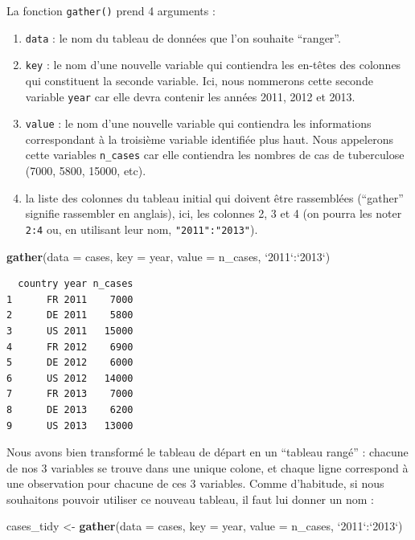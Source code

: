 \documentclass[a4paperpaper,]{article}
\newenvironment{Shaded}{\begin{snugshade}}{\end{snugshade}}
\newcommand{\DataTypeTok}[1]{\textcolor[rgb]{0.00,0.34,0.68}{#1}}
\newcommand{\KeywordTok}[1]{\textcolor[rgb]{0.12,0.11,0.11}{\textbf{#1}}}
\newcommand{\NormalTok}[1]{\textcolor[rgb]{0.12,0.11,0.11}{#1}}
\newcommand{\OperatorTok}[1]{\textcolor[rgb]{0.12,0.11,0.11}{#1}}
\newcommand{\StringTok}[1]{\textcolor[rgb]{0.75,0.01,0.01}{#1}}
\providecommand{\tightlist}{%
  \setlength{\itemsep}{0pt}\setlength{\parskip}{0pt}}
\begin{document}
La fonction \texttt{gather()} prend 4 arguments :

\begin{enumerate}
\def\labelenumi{\arabic{enumi}.}
\tightlist
\item
  \texttt{data} : le nom du tableau de données que l'on souhaite ``ranger''.
\item
  \texttt{key} : le nom d'une nouvelle variable qui contiendra les en-têtes des colonnes qui constituent la seconde variable. Ici, nous nommerons cette seconde variable \texttt{year} car elle devra contenir les années 2011, 2012 et 2013.
\item
  \texttt{value} : le nom d'une nouvelle variable qui contiendra les informations correspondant à la troisième variable identifiée plus haut. Nous appelerons cette variables \texttt{n\_cases} car elle contiendra les nombres de cas de tuberculose (7000, 5800, 15000, etc).
\item
  la liste des colonnes du tableau initial qui doivent être rassemblées (``gather'' signifie rassembler en anglais), ici, les colonnes 2, 3 et 4 (on pourra les noter \texttt{2:4} ou, en utilisant leur nom, \texttt{"2011":"2013"}).
\end{enumerate}

\begin{Shaded}
\begin{Highlighting}[]
\KeywordTok{gather}\NormalTok{(}\DataTypeTok{data =}\NormalTok{ cases, }\DataTypeTok{key =}\NormalTok{ year, }\DataTypeTok{value =}\NormalTok{ n_cases, }\StringTok{`}\DataTypeTok{2011}\StringTok{`}\OperatorTok{:}\StringTok{`}\DataTypeTok{2013}\StringTok{`}\NormalTok{)}
\end{Highlighting}
\end{Shaded}

\begin{verbatim}
  country year n_cases
1      FR 2011    7000
2      DE 2011    5800
3      US 2011   15000
4      FR 2012    6900
5      DE 2012    6000
6      US 2012   14000
7      FR 2013    7000
8      DE 2013    6200
9      US 2013   13000
\end{verbatim}

Nous avons bien transformé le tableau de départ en un ``tableau rangé'' : chacune de nos 3 variables se trouve dans une unique colone, et chaque ligne correspond à une observation pour chacune de ces 3 variables. Comme d'habitude, si nous souhaitons pouvoir utiliser ce nouveau tableau, il faut lui donner un nom :

\begin{Shaded}
\begin{Highlighting}[]
\NormalTok{cases_tidy <-}\StringTok{ }\KeywordTok{gather}\NormalTok{(}\DataTypeTok{data =}\NormalTok{ cases, }\DataTypeTok{key =}\NormalTok{ year, }\DataTypeTok{value =}\NormalTok{ n_cases, }\StringTok{`}\DataTypeTok{2011}\StringTok{`}\OperatorTok{:}\StringTok{`}\DataTypeTok{2013}\StringTok{`}\NormalTok{)}
\end{Highlighting}
\end{Shaded}
\end{document}
